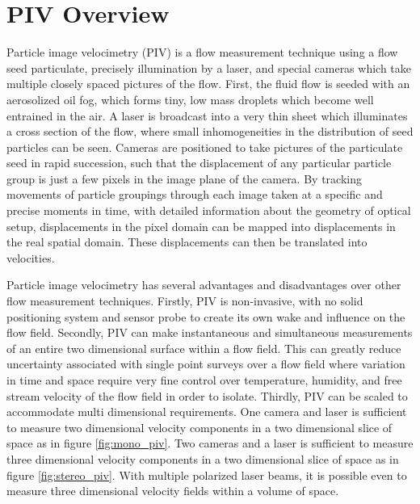 \section{PIV Overview}

Particle image velocimetry (PIV) is a flow measurement technique using a flow 
seed particulate, precisely illumination by a laser, and special cameras which 
take multiple closely spaced pictures of the flow. First, the fluid flow is 
seeded with an aerosolized oil fog, which forms tiny, low mass droplets which 
become well entrained in the air. A laser is broadcast into a very thin sheet 
which illuminates a cross section of the flow, where small inhomogeneities in 
the distribution of seed particles can be seen. Cameras are positioned to take 
pictures of the particulate seed in rapid succession, such that the 
displacement of any particular particle group is just a few pixels in the image 
plane of the camera. By tracking movements of particle groupings through each 
image taken at a specific and precise moments in time, with detailed 
information about the geometry of optical setup, displacements in the pixel 
domain can be mapped into displacements in the real spatial domain. These 
displacements can then be translated into velocities.

Particle image velocimetry has several advantages and disadvantages over other 
flow measurement techniques. Firstly, PIV is non-invasive, with no solid 
positioning system and sensor probe to create its own wake and influence on the 
flow field. Secondly, PIV can make instantaneous and simultaneous measurements 
of an entire two dimensional surface within a flow field. This can greatly 
reduce uncertainty associated with single point surveys over a flow field where 
variation in time and space require very fine control over temperature, 
humidity, and free stream velocity of the flow field in order to isolate. 
Thirdly, PIV can be scaled to accommodate multi dimensional requirements. One 
camera and laser is sufficient to measure two dimensional velocity 
components in a two dimensional slice of space as in figure \ref{fig:mono_piv}. 
Two cameras and a laser is sufficient to measure three dimensional velocity
components in a two dimensional slice of space as in figure
\ref{fig:stereo_piv}. With multiple polarized laser beams, it is possible even
to measure three dimensional velocity fields within a volume of space. 

